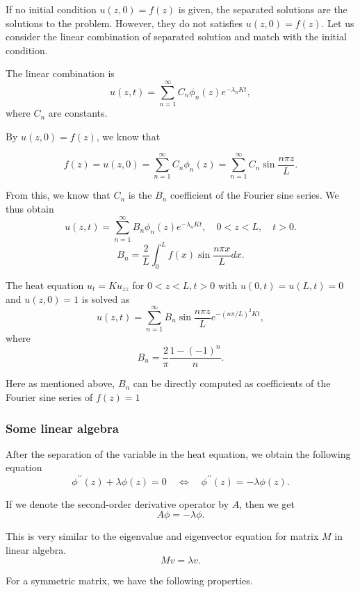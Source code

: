 If no initial condition $u(z, 0) = f(z)$ is given, the separated solutions are the solutions to the problem. However, they do not satisfies $u(z, 0) = f(z)$.
Let us consider the linear combination of separated solution and match with the initial condition.

The linear combination is 
$$
u(z, t)=\sum_{n=1}^{\infty} C_n \phi_n(z) e^{-\lambda_n K t},
$$
where $C_n$ are constants. 

By $u(z, 0) = f(z)$, we know that 

$$
f(z) = u(z, 0) = \sum_{n=1}^{\infty} C_n \phi_n(z) = \sum_{n=1}^{\infty} C_n \sin \frac{n\pi z}{L}.
$$

From this, we know that $C_n$ is the $B_n$ coefficient of the Fourier sine series. We thus obtain
$$
u(z, t)=\sum_{n=1}^{\infty} B_n \phi_n(z) e^{-\lambda_n K t}, \quad 0<z<L, \quad t>0 .
$$
$$
B_n=\frac{2}{L} \int_0^L f(x) \sin \frac{n \pi x}{L} d x.
$$

\begin{example}[]
The heat equation $u_t=K u_{z z}$ for $0<z<L, t>0$ with $u(0, t)=u(L, t)=0$ and $u(z, 0)=1$ is solved as
$$
u(z, t)=\sum_{n=1}^{\infty} B_n \sin \frac{n \pi z}{L} e^{-(n \pi / L)^2 K t},
$$
where  
$$
B_n=\frac{2}{\pi} \frac{1-(-1)^n}{n} .
$$

Here as mentioned above, $B_n$ can be directly computed as coefficients of the Fourier sine series of $f(z) = 1$
\end{example}

\subsubsection{Some linear algebra}

After the separation of the variable in the heat equation, we obtain the following equation
$$
\phi^{\prime \prime}(z)+\lambda \phi(z)=0 \quad \Leftrightarrow \quad \phi^{\prime \prime}(z) = -\lambda \phi(z).
$$

If we denote the second-order derivative operator by $A$, then we get
$$
A\phi = -\lambda\phi.
$$ 

This is very similar to the eigenvalue and eigenvector equation for matrix $M$ in linear algebra.
\begin{equation}\label{eq.eigenvalue_linear_alg}
    M v = \lambda v.
\end{equation}

For a symmetric matrix, we have the following properties.

